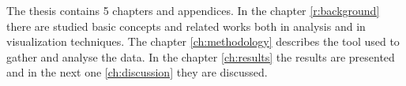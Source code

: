 
The thesis contains 5 chapters and appendices. In the chapter \ref{r:background} there are studied basic concepts and related works both in analysis and in visualization techniques. The chapter \ref{ch:methodology} describes the tool used to gather and analyse the data. In the chapter \ref{ch:results} the results are presented and in the next one \ref{ch:discussion} they are discussed.







